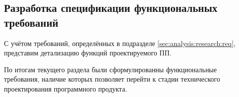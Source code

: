 \subsection{Разработка спецификации функциональных требований}
\label{sec:analysis:research:funcreq}

С учётом требований, определённых в подразделе \ref{sec:analysis:research:req}, представим детализацию функций проектируемого ПП.








По итогам текущего раздела были сформулированны функциональные требования, наличие которых позволяет перейти к стадии технического проектирования программного продукта.